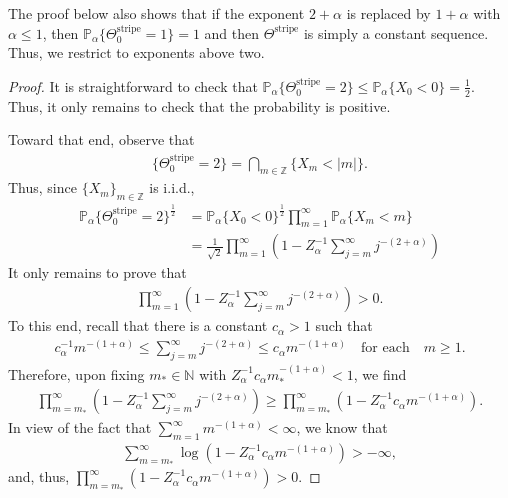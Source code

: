 \documentclass[12pt]{amsart}
\begin{document}
	The proof below also shows that if the exponent $2 + \alpha$ is replaced by $1 + \alpha$ with $\alpha \leq 1$, then $\mathbb{P}_{\alpha}\{\Theta^{\text{stripe}}_{0} = 1\} = 1$ and then $\Theta^{\text{stripe}}$ is simply a constant sequence.  Thus, we restrict to exponents above two.
	
		\begin{proof} It is straightforward to check that $\mathbb{P}_{\alpha}\{\Theta_{0}^{\text{stripe}} = 2\} \leq \mathbb{P}_{\alpha}\{X_{0} < 0\} = \frac{1}{2}$.  Thus, it only remains to check that the probability is positive. 
		
		Toward that end, observe that 
			\begin{align*}
				\{\Theta^{\text{stripe}}_{0} = 2\} = \bigcap_{m \in \mathbb{Z}} \{X_{m} < |m|\}.
			\end{align*}
		Thus, since $\{X_{m}\}_{m \in \mathbb{Z}}$ is i.i.d.,
			\begin{align*}
				\mathbb{P}_{\alpha}\{\Theta^{\text{stripe}}_{0} = 2\}^{\frac{1}{2}}
				&= \mathbb{P}_{\alpha}\{X_{0} < 0\}^{\frac{1}{2}} \prod_{m = 1}^{\infty} \mathbb{P}_{\alpha}\{X_{m} < m\} \\
				&= \frac{1}{\sqrt{2}} \prod_{m = 1}^{\infty} \left(1 - Z_{\alpha}^{-1} \sum_{j = m}^{\infty} j^{-(2 + \alpha)} \right)
			\end{align*}
		It only remains to prove that 
			\begin{align*}
				\prod_{m = 1}^{\infty} \left(1 - Z_{\alpha}^{-1} \sum_{j = m}^{\infty} j^{-(2 + \alpha)} \right) > 0.
			\end{align*}
		To this end, recall that there is a constant $c_{\alpha} > 1$ such that
			\begin{align} \label{E: useful integral comparison algebraic}
				c_{\alpha}^{-1} m^{-(1 + \alpha)} \leq \sum_{j = m}^{\infty} j^{-(2 + \alpha)} \leq c_{\alpha} m^{-(1 + \alpha)} \quad \text{for each} \quad m \geq 1.
			\end{align}
		Therefore, upon fixing $m_{*} \in \mathbb{N}$ with $Z_{\alpha}^{-1} c_{\alpha} m_{*}^{-(1 + \alpha)} < 1$, we find
			\begin{align*}
			\prod_{m = m_{*}}^{\infty} \left(1 - Z_{\alpha}^{-1} \sum_{j = m}^{\infty} j^{-(2 + \alpha)} \right) \geq \prod_{m = m_{*}}^{\infty} \left( 1 - Z_{\alpha}^{-1} c_{\alpha} m^{-(1 + \alpha)} \right).
			\end{align*}
		In view of the fact that $\sum_{m = 1}^{\infty} m^{-(1 + \alpha)} < \infty$, we know that 
			\begin{align*}
				\sum_{m = m_{*}}^{\infty} \log \left( 1 - Z_{\alpha}^{-1} c_{\alpha} m^{-(1 + \alpha)} \right) > - \infty ,
			\end{align*}
		and, thus, $\prod_{m = m_{*}}^{\infty} \left( 1 - Z_{\alpha}^{-1} c_{\alpha} m^{-(1 + \alpha)} \right) > 0$.
		\end{proof}
\end{document}
